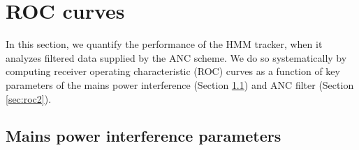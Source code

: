 \documentclass[pra,superscriptaddress,reprint,amsmath,amssymb,nofootinbib]{revtex4-2}
\begin{document}
\section{ROC curves}\label{sec:theroccurves}



In this section, we quantify the performance of the HMM tracker, when it analyzes filtered data supplied by the ANC scheme. We do so systematically by computing receiver operating characteristic (ROC) curves as a function of key parameters of the mains power interference (Section \ref{sec:roc1}) and ANC filter (Section \ref{sec:roc2}).

\subsection{Mains power interference parameters} \label{sec:roc1}
\end{document}
